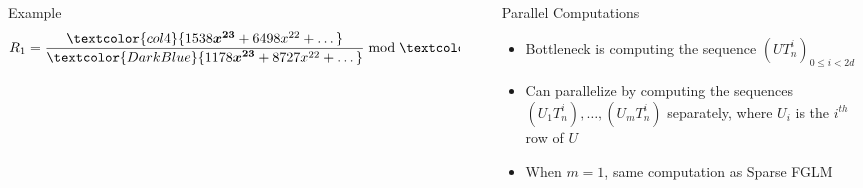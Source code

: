 \documentclass[final]{beamer}
\newlength{\sepwid}
\newlength{\onecolwid}
\newlength{\twocolwid}
\begin{document}
\begin{frame}[t]
\begin{columns}[t]
\begin{column}{\twocolwid}
\begin{alertblock}{{\sf Example}}
	$$R_1 =\frac{ \textcolor{col4}{  1538\boldsymbol{x^{23}} + 6498x^{22} + \dots }}{  \textcolor{DarkBlue}{1178\boldsymbol{x^{23}} + 8727x^{22} + \dots} } \bmod \textcolor{DarkGreen}{{\boldsymbol{x^{8}} + 6990x^{7}+ \dots }} = 7964\boldsymbol{x^7} + 4071x^6 + \dots$$


        \end{alertblock}


\end{column} %

\begin{column}{\sepwid}\end{column} %

\begin{column}{\onecolwid} %

\begin{alertblock}{Parallel Computations}
	\begin{itemize}
		\item Bottleneck is computing the sequence $(UT_n^i)_{0 \le i < 2d}$
		\item Can parallelize by computing the sequences $(U_1T_n^i),\dots,(U_mT_n^i)$
		separately, where $U_i$ is the $i^{th}$ row of $U$
		\item When $m=1$, same computation as Sparse FGLM
	\end{itemize}
\end{alertblock}








\end{column}
\end{columns}
\end{frame}
\end{document}
